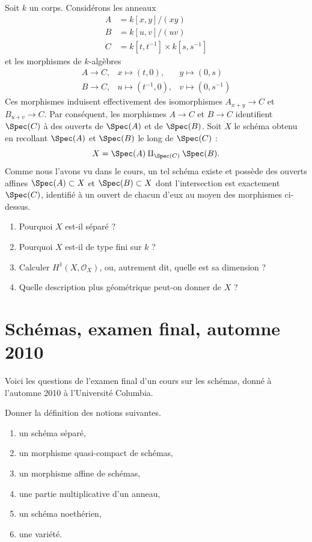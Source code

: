 \begin{exercise}
\label{exercise-glueing}
Soit $k$ un corps.
Considérons les anneaux
\begin{align*}
A & = k[x, y]/(xy) \\
B & = k[u, v]/(uv) \\
C & = k[t, t^{-1}] \times k[s, s^{-1}]
\end{align*}
et les morphismes de $k$-algèbres
$$
\begin{matrix}
A \longrightarrow C, &
x \mapsto (t, 0), &
y \mapsto (0, s) \\
B \longrightarrow C, &
u \mapsto (t^{-1}, 0), &
v \mapsto (0, s^{-1})
\end{matrix}
$$
Ces morphismes induisent effectivement des isomorphismes
$A_{x + y} \to C$ et $B_{u + v} \to C$. Par conséquent, les morphismes $A \to C$
et $B \to C$ identifient $\Spec(C)$ à des ouverts de
$\Spec(A)$ et de $\Spec(B)$. Soit $X$ le schéma obtenu
en recollant $\Spec(A)$ et $\Spec(B)$ le long de $\Spec(C)$ :
$$
X = \Spec(A) \amalg_{\Spec(C)} \Spec(B).
$$
Comme nous l'avons vu dans le cours, un tel schéma existe et possède des
ouverts affines $\Spec(A) \subset X$ et $\Spec(B) \subset X$
dont l'intersection est exactement $\Spec(C)$, identifié à un ouvert de
chacun d'eux au moyen des morphismes ci-dessus.
\begin{enumerate}
\item Pourquoi $X$ est-il séparé ?
\item Pourquoi $X$ est-il de type fini sur $k$ ?
\item Calculer $H^1(X, \mathcal{O}_X)$, ou, autrement dit, quelle est sa dimension ?
\item Quelle description plus géométrique peut-on donner de $X$ ?
\end{enumerate}
\end{exercise}





\section{Schémas, examen final, automne 2010}
\label{section-final-exam-fall-2010}

\noindent
Voici les questions de l'examen final d'un cours sur les schémas,
donné à l'automne 2010 à l'Université Columbia.

\begin{exercise}[Définitions]
\label{exercise-definitions-fall-2010}
Donner la définition des notions suivantes.
\begin{enumerate}
\item un schéma séparé,
\item un morphisme quasi-compact de schémas,
\item un morphisme affine de schémas,
\item une partie multiplicative d'un anneau,
\item un schéma noethérien,
\item une variété.
\end{enumerate}
\end{exercise}

